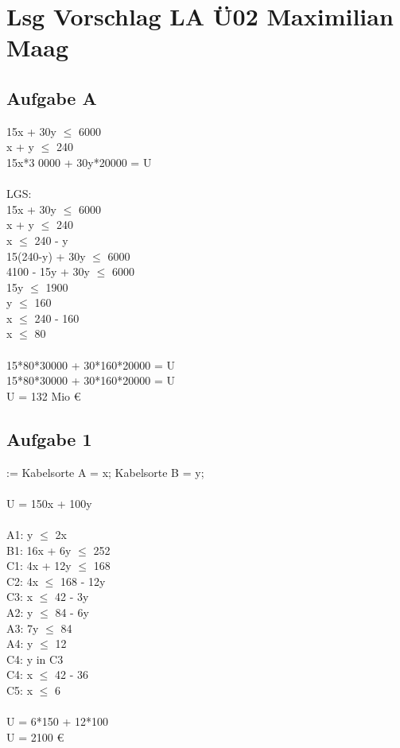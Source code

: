 \documentclass{article}
\begin{document}
	\section*{Lsg Vorschlag LA Ü02 Maximilian Maag}
	\subsection*{Aufgabe A}
	15x + 30y $\leq$ 6000 \\
	x + y $\leq$ 240 \\
	15x*3	0000 + 30y*20000 = U \\ \\
	LGS: \\
	15x + 30y $\leq$ 6000 \\
	x + y $\leq$ 240 \\
	x $\leq$ 240 - y \\
	15(240-y) + 30y $\leq$ 6000 \\
	4100 - 15y + 30y $\leq$ 6000 \\
	15y $\leq$ 1900 \\
	y $\leq$ 160 \\
	x $\leq$ 240 - 160 \\
	x $\leq$ 80  \\ \\
	15*80*30000 + 30*160*20000 = U \\
	15*80*30000 + 30*160*20000 = U \\ 
	U = 132 Mio €
	\subsection*{Aufgabe 1}
	:= Kabelsorte A = x; Kabelsorte B = y; \\ \\
	U = 150x + 100y \\ \\
	A1: y $\leq$ 2x \\
	B1: 16x + 6y $\leq$ 252 \\
	C1: 4x +  12y  $\leq$ 168 \\
	C2: 4x  $\leq$ 168 - 12y \\
	C3: x  $\leq$ 42 - 3y \\
	A2: y $\leq$ 84 - 6y \\
	A3: 7y $\leq$ 84 \\
	A4: y $\leq$ 12 \\
	C4: y in C3 \\
	C4: x  $\leq$ 42 - 36 \\
	C5: x  $\leq$ 6 \\ \\
	U = 6*150 + 12*100 \\
	U = 2100 €
\end{document}
